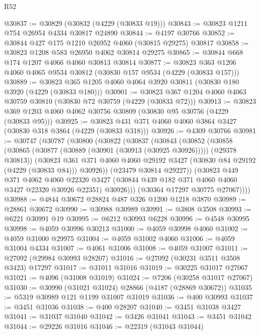 \begin{lexlean}{R52}
\begin{coremodule}
@30837 := @30829 (@30832 (@4229 (@30833 @19)))
@30843 := @30823 @1211 @754 @26954 @4334 @30817 @24890
@30844 := @4197 @30766
@30852 := @30844 @427 @175 @1210 @26952 @4060 (@30815 @29275) @30817
@30858 := @30823 @1208 @583 @26950 @4062 @30814 @29275
@30865 := @30844 @668 @174 @1207 @4066 @4060 @30813 @30814
@30877 := @30823 @363 @1206 @4060 @4065 @9534 @30812 (@30830 @157 @9534 (@4229 (@30833 @157)))
@30889 := @30823 @365 @1205 @4060 @4064 @3920 @30811 (@30830 @180 @3920 (@4229 (@30833 @180)))
@30901 := @30823 @367 @1204 @4060 @4063 @30759 @30810 (@30830 @72 @30759 (@4229 (@30833 @72)))
@30913 := @30823 @369 @1203 @4060 @4062 @30756 @30809 (@30830 @95 @30756 (@4229 (@30833 @95)))
@30925 := @30823 @431 @371 @4060 @4060 @3864 @3427 (@30830 @318 @3864 (@4229 (@30833 @318)))
@30926 := @4309 @30766
@30981 := @30747
    (@30787
      (@30800
        (@30822
          (@30837
            (@30843
              (@30852
                (@30858
                  (@30865 (@30877 (@30889 (@30901 (@30913 (@30925 @30926))))) (@29378 @30813))
                  (@30823
                    @361
                    @371
                    @4060
                    @4060
                    @29192
                    @3427
                    (@30830 @84 @29192 (@4229 (@30833 @84)))
                    @30926))
                (@23479 @30814 @29227))
              (@30823
                @449
                @371
                @4062
                @4060
                @22320
                @3427
                (@30844 @439 @182 @371 @4060 @4060 @3427 @22320 @30926 @22351)
                @30926)))
          (@30364 @17297 @30775 @27067))))
@30988 := @4844 @30672 @28824 @487 @326 @1200 @1218 @3870
@30989 := @28861 @30672
@30990 := @30988 @30989
@30991 := @3808 @3508
@30993 := @6221 @30991 @19
@30995 := @6212 @30993 @6228
@30996 := @4548 @30995
@30998 := @4059 @30996 @30213
@31000 := @4059 @30998 @4060
@31002 := @4059 @31000 @29975
@31004 := @4059 @31002 @4060
@31006 := @4059 @31004 @4334
@31007 := @4061 @31006
@31008 := @4059 @31007
@31011 := @27092 (@29984 @30993 @28207)
@31016 := @27092 (@30231 @3511 @3508 @3423) @17297
@31017 := @31011 @31016
@31019 := @30225 @31017 @27067
@31021 := @4096 (@31008 @31019)
@31024 := @7206 (@30258 @31017 @27067)
@31030 := @30990 (@31021 @31024) @28866 (@4187 (@28869 @30672))
@31035 := @5319 @30989 @121 @1199 @31007 @31019
@31036 := @400 @30993
@31037 := @3451 @31036
@31038 := @400 @28207
@31040 := @3451 @31038 @3427
@31041 := @31037 @31040
@31042 := @3426 @31041
@31043 := @3451 @31042
@31044 := @29226 @31016
@31046 := @22319 (@31043 @31044)

\end{coremodule}
\end{lexlean}
